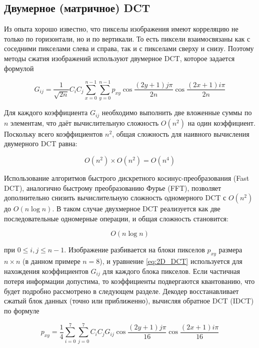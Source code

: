 \subsection{Двумерное (матричное) DCT}

Из опыта хорошо известно, что пикселы изображения имеют корреляцию  не только по горизонтали, но и по вертикали. 
То есть пиксели взаимосвязаны как с соседними пикселами слева и справа, так и с пикселами сверху и снизу. 
Поэтому методы сжатия изо­бражений используют двумерное DCT, которое задается формулой

\begin{equation}
    G_{ij} = \frac{1}{\sqrt{2n}} C_i C_j\sum_{x=0}^{n-1} \sum_{y=0}^{n-1} p_{xy} \cos{\frac{(2y+1)j \pi}{2n} \cos{\frac{(2x+1)i \pi}{2n}}}
    \label{eq:2D_DCT}
\end{equation}


Для каждого коэффициента $G_{ij}$ необходимо выполнить две вложенные суммы по $n$ элементам, 
что даёт вычислительную сложность $O(n^2)$ на один коэффициент. 
Поскольку всего коэффициентов $n^2$, общая сложность для наивного вычисления двумерного DCT равна:

\begin{equation}
    O(n^2) \times O(n^2) = O(n^4)
    \label{eq:asimp_dct}
\end{equation}


Использование алгоритмов быстрого дискретного косинус-преобразования (Fast DCT), 
аналогично быстрому преобразованию Фурье (FFT), 
позволяет дополнительно снизить вычислительную сложность одномерного DCT с $O(n^2)$ до $O(n \log{n})$.
В таком случае двухмерное DCT реализуется как две последовательные одномерные операции, и общая сложность становится:

\begin{equation}
    O(n \log{n})
    \label{eq:fast_asimp_dct}
\end{equation}


при $0 \leq i, j \leq n - 1$. Изображение разбивается на блоки пикселов $p_{xy}$ размера $n \times n$ (в данном примере $n = 8$), 
и уравнение \eqref{eq:2D_DCT} используется для нахождения коэффициентов $G_{ij}$ для каждого блока пикселов.
Если частичная потеря информации допустима, то коэффициенты подвергаются квантованию, что будет подробно рассмотрено в следующем разделе. 
Декодер восстанавливает сжатый блок данных (точно или приближенно), вычисляя обратное DCT (IDCT) по формуле


\begin{equation}
    p_{xy} = \frac{1}{4} \sum_{i = 0}^{7} \sum_{j = 0}^{7} C_i C_j G_{ij} \cos{\frac{(2y+1)j \pi}{16} \cos{\frac{(2x+1)i \pi}{16}}}
    \label{eq:I2D_DCT}
\end{equation}

